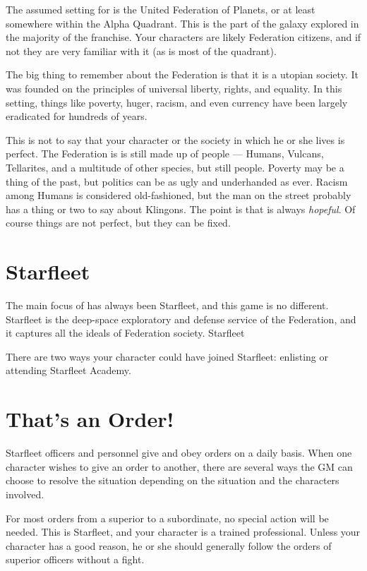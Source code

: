 \documentclass[12pt,titlepage,openany]{book}
\begin{document}
\noindent
The assumed setting for \StarTrekFate{} is the United Federation of Planets, or
at least somewhere within the Alpha Quadrant. This is the part of the galaxy
explored in the majority of the \StarTrek{} franchise. Your characters are
likely Federation citizens, and if not they are very familiar with it (as is
most of the quadrant).

The big thing to remember about the Federation is that it is a utopian society.
It was founded on the principles of universal liberty, rights, and equality. In
this setting, things like poverty, huger, racism, and even currency have been
largely eradicated for hundreds of years.

This is not to say that your character or the society in which he or she lives
is perfect. The Federation is is still made up of people --- Humans, Vulcans,
Tellarites, and a multitude of other species, but still people. Poverty may be
a thing of the past, but politics can be as ugly and underhanded as ever.
Racism among Humans is considered old-fashioned, but the man on the street
probably has a thing or two to say about Klingons. The point is that
\StarTrek{} is always \emph{hopeful}. Of course things are not perfect, but
they can be fixed.

\section{Starfleet}

The main focus of \StarTrek{} has always been Starfleet, and this game is no
different. Starfleet is the deep-space exploratory and defense service of the
Federation, and it captures all the ideals of Federation society. Starfleet

There are two ways your character could have joined Starfleet: enlisting or
attending Starfleet Academy.

\section{That's an Order!}\label{sec:orders}

Starfleet officers and personnel give and obey orders on a daily basis. When
one character wishes to give an order to another, there are several ways the GM
can choose to resolve the situation depending on the situation and the
characters involved.

For most orders from a superior to a subordinate, no special action will be
needed. This is Starfleet, and your character is a trained professional.
Unless your character has a good reason, he or she should generally follow the
orders of superior officers without a fight.
\end{document}
